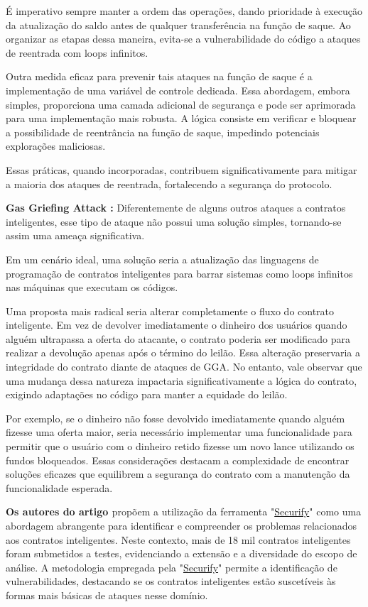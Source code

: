É imperativo sempre manter a ordem das operações, dando prioridade à execução da atualização do saldo antes de qualquer transferência na função de saque. Ao organizar as etapas dessa maneira, evita-se a vulnerabilidade do código a ataques de reentrada com loops infinitos.

Outra medida eficaz para prevenir tais ataques na função de saque é a implementação de uma variável de controle dedicada. Essa abordagem, embora simples, proporciona uma camada adicional de segurança e pode ser aprimorada para uma implementação mais robusta. A lógica consiste em verificar e bloquear a possibilidade de reentrância na função de saque, impedindo potenciais explorações maliciosas.

Essas práticas, quando incorporadas, contribuem significativamente para mitigar a maioria dos ataques de reentrada, fortalecendo a segurança do protocolo.
\newline
\newline

\textbf{Gas Griefing Attack \cite{GGA}: } Diferentemente de alguns outros ataques a contratos inteligentes, esse tipo de ataque não possui uma solução simples, tornando-se assim uma ameaça significativa.

Em um cenário ideal, uma solução seria a atualização das linguagens de programação de contratos inteligentes para barrar sistemas como loops infinitos nas máquinas que executam os códigos.

Uma proposta mais radical seria alterar completamente o fluxo do contrato inteligente. Em vez de devolver imediatamente o dinheiro dos usuários quando alguém ultrapassa a oferta do atacante, o contrato poderia ser modificado para realizar a devolução apenas após o término do leilão. Essa alteração preservaria a integridade do contrato diante de ataques de GGA. No entanto, vale observar que uma mudança dessa natureza impactaria significativamente a lógica do contrato, exigindo adaptações no código para manter a equidade do leilão.

Por exemplo, se o dinheiro não fosse devolvido imediatamente quando alguém fizesse uma oferta maior, seria necessário implementar uma funcionalidade para permitir que o usuário com o dinheiro retido fizesse um novo lance utilizando os fundos bloqueados. Essas considerações destacam a complexidade de encontrar soluções eficazes que equilibrem a segurança do contrato com a manutenção da funcionalidade esperada.

\textbf{Os autores do artigo \cite{SMPP}} propõem a utilização da ferramenta "\href{https://github.com/eth-sri/securify2}{Securify}" como uma abordagem abrangente para identificar e compreender os problemas relacionados aos contratos inteligentes. Neste contexto, mais de 18 mil contratos inteligentes foram submetidos a testes, evidenciando a extensão e a diversidade do escopo de análise. A metodologia empregada pela "\href{https://github.com/eth-sri/securify2}{Securify}" permite a identificação de vulnerabilidades, destacando se os contratos inteligentes estão suscetíveis às formas mais básicas de ataques nesse domínio.

